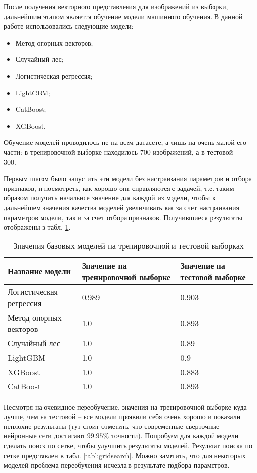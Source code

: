 После получения векторного представления для изображений из выборки, дальнейшим этапом является обучение модели машинного обучения. В данной работе использовались следующие модели:
\begin{itemize}
	\item Метод опорных векторов;
	\item Случайный лес;
	\item Логистическая регрессия;
	\item LightGBM;
	\item CatBoost;
	\item XGBoost.
\end{itemize}

Обучение моделей проводилось не на всем датасете, а лишь на очень малой его части: в тренировочной выборке находилось 700 изображений, а в тестовой -- 300. 

Первым шагом было запустить эти модели без настраивания параметров и отбора признаков, и посмотреть, как хорошо они справляются с задачей, т.е. таким образом получить начальное значение для каждой из модели, чтобы в дальнейшем значения качества моделей увеличивать как за счет настраивания параметров модели, так и за счет отбора признаков. Получившиеся результаты отображены в табл. \ref{tabl:baselines}.

\begin{table}[!htbp]
	\centering
	\small
	\caption{Значения базовых моделей на тренировочной и тестовой выборках}	
	\begin{tabularx}{\linewidth}{|X|X|X|}
		\hline
		Название модели & Значение на тренировочной выборке & Значение на тестовой выборке\\ \hline
		Логистическая регрессия & 0.989 & 0.903 \\
		\hline 
		Метод опорных векторов & 1.0 & 0.893 \\
		\hline
		Случайный лес & 1.0 & 0.89 \\
		\hline
		LightGBM & 1.0 & 0.9 \\
		\hline
		XGBoost & 1.0 & 0.883 \\
		\hline
		CatBoost & 1.0 & 0.893 \\ 
		\hline
	\end{tabularx}
	\label{tabl:baselines}
\end{table}

Несмотря на очевидное переобучение, значения на тренировочной выборке куда лучше, чем на тестовой -- все модели проявили себя очень хорошо и показали неплохие результаты (тут стоит отметить, что современные сверточные нейронные сети достигают $99.95\%$ точности). Попробуем для каждой модели сделать поиск по сетке, чтобы улучшить результаты моделей. Результат поиска по сетке представлен в табл. \ref{tabl:gridsearch}. Можно заметить, что для некоторых моделей проблема переобучения исчезла в результате подбора параметров.


